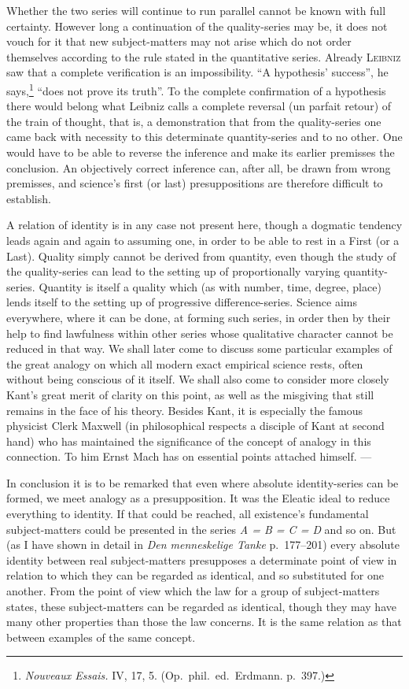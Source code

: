 \documentclass[12pt]{book}
\newcommand{\opage}[1]{\marginnote{\footnotesize\textit{[#1]}}}
\begin{document}
Whether the two series will continue to run parallel cannot be known with full
certainty. However long a continuation of the quality-series may be, it does not
vouch for it that new subject-matters may not arise which do not order themselves
according to the rule stated in the \opage{60}quantitative series. Already \textsc{Leibniz}
saw that a complete verification is an impossibility. ``A hypothesis' success'',
he says,\footnote{\textit{Nouveaux Essais.} IV, 17, 5. (Op.\ phil.\ ed.\
Erdmann. p.\ 397.)} ``does not prove its truth''. To the complete confirmation
of a hypothesis there would belong what Leibniz calls a complete reversal (un
parfait retour) of the train of thought, that is, a demonstration that from the
quality-series one came back with necessity to this determinate quantity-series
and to no other. One would have to be able to reverse the inference and make its
earlier premisses the conclusion. An objectively correct inference can, after
all, be drawn from wrong premisses, and science's first (or last)
presuppositions are therefore difficult to establish.

A relation of identity is in any case not present here, though a dogmatic
tendency leads again and again to assuming one, in order to be able to rest in a
First (or a Last). Quality simply cannot be derived from quantity, even though
the study of the quality-series can lead to the setting up of proportionally
varying quantity-series. Quantity is itself a quality which (as with number,
time, degree, place) lends itself to the setting up of progressive
difference-series. Science aims everywhere, where it can be done, at forming such
series, in order then by their help to find lawfulness within other series whose
qualitative character cannot be reduced in that way. We shall later come to
discuss some particular examples of the great analogy on which all modern exact
empirical science rests, often without being conscious of it itself. We shall
also come to consider more closely Kant's great merit of clarity on this point,
as well as the misgiving that still remains in the face of his theory. \opage{61}Besides
Kant, it is especially the famous physicist Clerk Maxwell (in philosophical
respects a disciple of Kant at second hand) who has maintained the significance
of the concept of analogy in this connection. To him Ernst Mach has on essential
points attached himself. ---

In conclusion it is to be remarked that even where absolute identity-series can
be formed, we meet analogy as a presupposition. It was the Eleatic ideal to
reduce everything to identity. If that could be reached, all existence's
fundamental subject-matters could be presented in the series
\textit{A = B = C = D} and so on. But (as I have shown in detail in
\textit{Den menneskelige Tanke} p.\ 177--201) every absolute identity between
real subject-matters presupposes a determinate point of view in relation to which
they can be regarded as identical, and so substituted for one another. From the
point of view which the law for a group of subject-matters states, these
subject-matters can be regarded as identical, though they may have many other
properties than those the law concerns. It is the same relation as that between
examples of the same concept.
\end{document}
